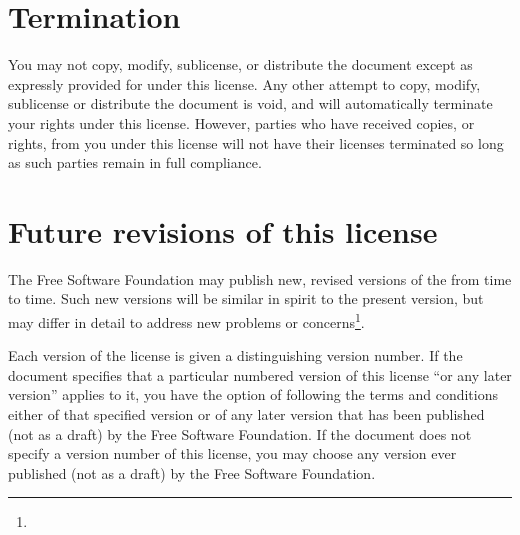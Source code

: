 \begin{multicols}{3}
\section{Termination}

You may not copy, modify, sublicense, or distribute the document except as expressly provided for under this license. Any other attempt to copy, modify, sublicense or distribute the document is void, and will automatically terminate your rights under this license. However, parties who have received copies, or rights, from you under this license will not have their licenses terminated so long as such parties remain in full compliance.

\section{Future revisions of this license}

The Free Software Foundation may publish new, revised versions of the \fdl from time to time. Such new versions will be similar in spirit to the present version, but may differ in detail to address new problems or concerns\footnote{\webCopyLeft}.

Each version of the license is given a distinguishing version number. If the document specifies that a particular numbered version of this license \enquote{or any later version} applies to it, you have the option of following the terms and conditions either of that specified version or of any later version that has been published (not as a draft) by the Free Software Foundation. If the document does not specify a version number of this license, you may choose any version ever published (not as a draft) by the Free Software Foundation.
\par \widebaselines \par
\end{multicols}
\egroup

\endinput



%
%
%
%
%           
%

